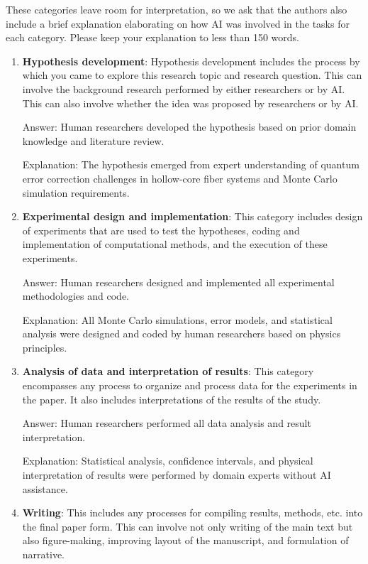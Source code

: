 \documentclass{article}
\begin{document}
These categories leave room for interpretation, so we ask that the authors also include a brief explanation elaborating on how AI was involved in the tasks for each category. Please keep your explanation to less than 150 words.

\begin{enumerate}
    \item \textbf{Hypothesis development}: Hypothesis development includes the process by which you came to explore this research topic and research question. This can involve the background research performed by either researchers or by AI. This can also involve whether the idea was proposed by researchers or by AI. 

    Answer: \involvementA{} Human researchers developed the hypothesis based on prior domain knowledge and literature review.
    
    Explanation: The hypothesis emerged from expert understanding of quantum error correction challenges in hollow-core fiber systems and Monte Carlo simulation requirements.
    
    \item \textbf{Experimental design and implementation}: This category includes design of experiments that are used to test the hypotheses, coding and implementation of computational methods, and the execution of these experiments. 

    Answer: \involvementA{} Human researchers designed and implemented all experimental methodologies and code.
    
    Explanation: All Monte Carlo simulations, error models, and statistical analysis were designed and coded by human researchers based on physics principles.
    
    \item \textbf{Analysis of data and interpretation of results}: This category encompasses any process to organize and process data for the experiments in the paper. It also includes interpretations of the results of the study.
 
    Answer: \involvementA{} Human researchers performed all data analysis and result interpretation.
    
    Explanation: Statistical analysis, confidence intervals, and physical interpretation of results were performed by domain experts without AI assistance.
    
    \item \textbf{Writing}: This includes any processes for compiling results, methods, etc. into the final paper form. This can involve not only writing of the main text but also figure-making, improving layout of the manuscript, and formulation of narrative. 


\end{enumerate}
\end{document}
